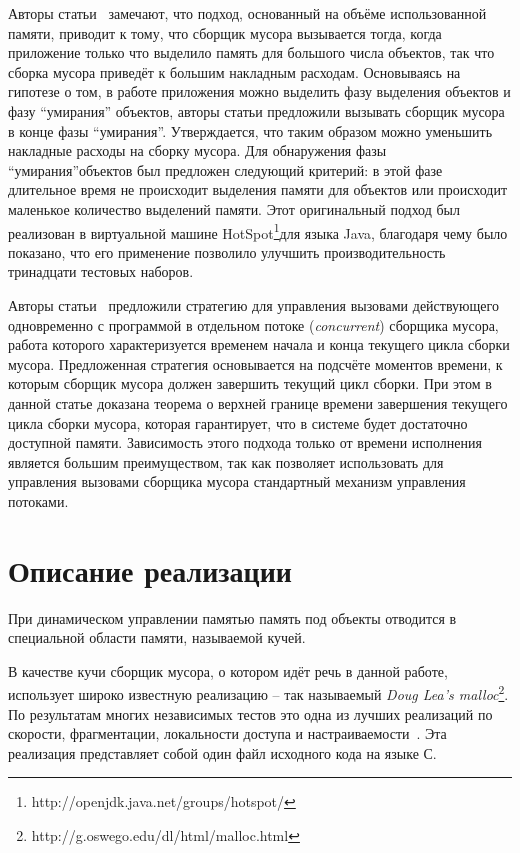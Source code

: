 Авторы статьи~\cite{microphase} замечают, что подход, основанный на объёме 
использованной памяти, приводит к тому, что сборщик мусора вызывается тогда, 
когда приложение только что выделило память для большого числа объектов, так что
сборка мусора приведёт к большим накладным расходам. Основываясь на гипотезе о том, 
в работе приложения можно выделить фазу выделения объектов и фазу ``умирания'' объектов,
авторы статьи предложили вызывать сборщик мусора в конце фазы ``умирания''. Утверждается,
что таким образом можно уменьшить накладные расходы на сборку мусора.
Для обнаружения фазы ``умирания''объектов был предложен следующий критерий: в этой
фазе длительное время не происходит выделения памяти для объектов или происходит маленькое 
количество выделений памяти. Этот оригинальный подход был реализован в виртуальной машине 
HotSpot\footnote{http://openjdk.java.net/groups/hotspot/}для 
языка Java, благодаря чему было показано,
что его применение позволило улучшить производительность тринадцати тестовых наборов. 


Авторы статьи~\cite{time-triggered} предложили стратегию для управления
вызовами действующего одновременно с программой в отдельном потоке
(\emph{concurrent}) сборщика мусора,
работа которого характеризуется временем начала и конца текущего цикла сборки мусора.
Предложенная стратегия основывается на подсчёте моментов времени, к которым
сборщик мусора должен завершить текущий цикл сборки. При этом в данной статье 
доказана теорема о верхней границе времени завершения текущего цикла сборки мусора,
которая гарантирует, что в системе будет достаточно доступной памяти. Зависимость этого
подхода только от времени исполнения является большим преимуществом, так как позволяет
использовать для управления вызовами сборщика мусора стандартный механизм управления
потоками. 

\section{Описание реализации}

При динамическом управлении памятью память под объекты отводится в специальной 
области памяти, называемой кучей. 

В качестве кучи сборщик мусора, о котором идёт речь в данной работе, использует
широко известную реализацию -- так называемый 
\emph{Doug Lea's malloc}\footnote{http://g.oswego.edu/dl/html/malloc.html}.
По результатам
многих независимых тестов это одна из лучших реализаций 
по скорости, фрагментации, локальности доступа и настраиваемости~\cite{Zorn}. 
Эта реализация представляет собой один файл исходного кода на языке С. 

